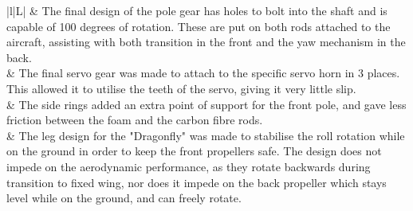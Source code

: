 \begin{table}[!htbp]
	\centering
	\caption{Gear, Legs and Front Ring Designs}
	\begin{tabulary}{\textwidth}{|l|L|}
		\hline
		\centering
		 &
		\vspace{40pt} The final design of the pole gear has holes to bolt into the shaft and is capable of 100 degrees of rotation. These are put on both rods attached to the aircraft, assisting with both transition in the front and the yaw mechanism in the back.  \\ 
		\hline 
		\centering
		 &
		\vspace{40pt} The final servo gear was made to attach to the specific servo horn in 3 places. This allowed it to utilise the teeth of the servo, giving it very little slip.\\ 
		\hline 
		\centering
		 &
		\vspace{40pt} The side rings added an extra point of support for the front pole, and gave less friction between the foam and the carbon fibre rods. \\ 
		\hline 
		\centering
		 &
		\vspace{40pt} The leg design for the "Dragonfly" was made to stabilise the roll rotation while on the ground in order to keep the front propellers safe. The design  does not impede on the aerodynamic performance, as they rotate backwards during transition to fixed wing, nor does it impede on the back propeller which stays level while on the ground, and can freely rotate.   \\ 
		\hline 
	\end{tabulary} 
	\label{tab:minor}
\end{table}
